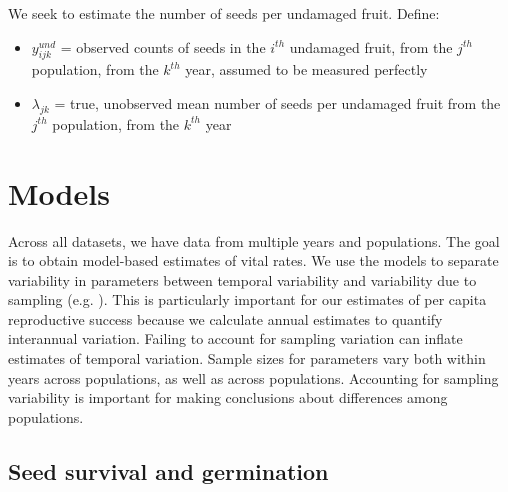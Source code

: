 \documentclass[12pt, oneside, titlepage]{article}   	%
\begin{document}
We seek to estimate the number of seeds per undamaged fruit. Define:

\begin{itemize}
	\item $y^{und}_{ijk}$ = observed counts of seeds in the $i^{th}$ undamaged fruit, from the $j^{th}$ population, from the $k^{th}$ year, assumed to be measured perfectly
	\item $\lambda_{jk}$ = true, unobserved mean number of seeds per undamaged fruit from the $j^{th}$ population, from the $k^{th}$ year
\end{itemize}

\section{Models}

Across all datasets, we have data from multiple years and populations. The goal is to obtain model-based estimates of vital rates. We use the models to separate variability in parameters between temporal variability and variability due to sampling (e.g. \cite{gould1998}). This is particularly important for our estimates of per capita reproductive success because we calculate annual estimates to quantify interannual variation. Failing to account for sampling variation can inflate estimates of temporal variation. Sample sizes for parameters vary both within years across populations, as well as across populations. Accounting for sampling variability is important for making conclusions about differences among populations. 
 
\subsection{Seed survival and germination}
\end{document}
